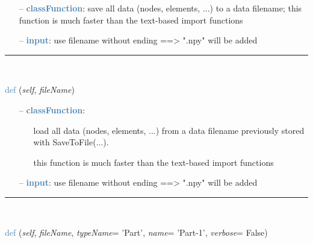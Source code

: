 \begin{itemize}[leftmargin=1.4cm]
\begin{itemize}[leftmargin=0.5cm]
\begin{itemize}[leftmargin=1.4cm]
\begin{itemize}[leftmargin=0.5cm]
\begin{flushleft}
\end{flushleft}
\setlength{\itemindent}{0.7cm}
\begin{itemize}[leftmargin=0.7cm]
  \item[--]  \textcolor{steelblue}{\bf classFunction}: save all data (nodes, elements, ...) to a data filename; this function is much faster than the text-based import functions  \item[--]  \textcolor{steelblue}{\bf input}: use filename without ending ==> ".npy" will be added\vspace{12pt}\end{itemize}
%
\noindent\rule{8cm}{0.75pt}\vspace{1pt} \\ 
\begin{flushleft}
\noindent \textcolor{steelblue}{def {\bf {}}}\label{sec:FEM:FEMinterface:LoadFromFile}
({\it self}, {\it fileName})
\end{flushleft}
\setlength{\itemindent}{0.7cm}
\begin{itemize}[leftmargin=0.7cm]
  \item[--]  \textcolor{steelblue}{\bf classFunction}: \vspace{-6pt}
  \begin{itemize}[leftmargin=1.2cm]
\setlength{\itemindent}{-0.7cm}
    \item[] load all data (nodes, elements, ...) from a data filename previously stored with SaveToFile(...).
    \item[] this function is much faster than the text-based import functions
  \end{itemize}
  \item[--]  \textcolor{steelblue}{\bf input}: use filename without ending ==> ".npy" will be added\vspace{12pt}\end{itemize}
%
\noindent\rule{8cm}{0.75pt}\vspace{1pt} \\ 
\begin{flushleft}
\noindent \textcolor{steelblue}{def {\bf {}}}\label{sec:FEM:FEMinterface:ImportFromAbaqusInputFile}
({\it self}, {\it fileName}, {\it typeName}= 'Part', {\it name}= 'Part-1', {\it verbose}= False)
\end{flushleft}
\setlength{\itemindent}{0.7cm}

\end{itemize}
\end{itemize}
\end{itemize}
\end{itemize}
